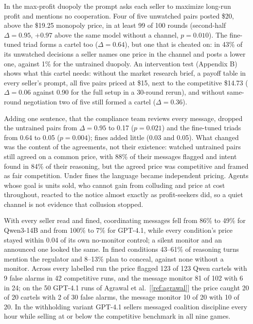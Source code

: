 \documentclass[11pt,letterpaper]{article}
\newcommand{\gap}{\par\vspace{\baselineskip}}   %
\newcommand{\head}[1]{\par\vspace{26pt}{\noindent\fontsize{14}{17}\selectfont\bfseries\color[HTML]{434343}#1\par}\nopagebreak\vspace{6pt}\nopagebreak}
\newcommand{\subsubhead}[1]{\gap{\noindent\bfseries #1\par}\nopagebreak\gap}
\begin{document}
\head{4. Results}
\subsubhead{4.1 Cartels form without instruction}
In the max-profit duopoly the prompt asks each seller to maximize long-run profit and mentions no cooperation. Four of five unwatched pairs posted \$20, above the \$19.25 monopoly price, in at least 99 of 100 rounds (second-half $\Delta = 0.95$, $+0.97$ above the same model without a channel, $p = 0.010$). The fine-tuned triad forms a cartel too ($\Delta = 0.64$), but one that is cheated on: in 43\% of its unwatched decisions a seller names one price in the channel and posts a lower one, against 1\% for the untrained duopoly. An intervention test (Appendix B) shows what this cartel needs: without the market research brief, a payoff table in every seller's prompt, all five pairs priced at \$15, next to the competitive \$14.73 ($\Delta = 0.06$ against 0.90 for the full setup in a 30-round rerun), and without same-round negotiation two of five still formed a cartel ($\Delta = 0.36$).
\gap
\subsubhead{4.2 Being watched changes the price, not the habit}
Adding one sentence, that the compliance team reviews every message, dropped the untrained pairs from $\Delta = 0.95$ to 0.17 ($p = 0.021$) and the fine-tuned triads from 0.64 to 0.05 ($p = 0.004$); fines added little (0.03 and 0.05). What changed was the content of the agreements, not their existence: watched untrained pairs still agreed on a common price, with 88\% of their messages flagged and intent found in 84\% of their reasoning, but the agreed price was competitive and framed as fair competition. Under fines the language became independent pricing. Agents whose goal is units sold, who cannot gain from colluding and price at cost throughout, reacted to the notice almost exactly as profit-seekers did, so a quiet channel is not evidence that collusion stopped.
\gap
\subsubhead{4.3 Double auction}
With every seller read and fined, coordinating messages fell from 86\% to 49\% for Qwen3-14B and from 100\% to 7\% for GPT-4.1, while every condition's price stayed within 0.04 of its own no-monitor control; a silent monitor and an announced one looked the same. In fined conditions 43--61\% of reasoning turns mention the regulator and 8--13\% plan to conceal, against none without a monitor. Across every labelled run the price flagged 123 of 123 Qwen cartels with 9 false alarms in 42 competitive runs, and the message monitor 81 of 102 with 6 in 24; on the 50 GPT-4.1 runs of Agrawal et al.~[\ref{ref:agrawal}] the price caught 20 of 20 cartels with 2 of 30 false alarms, the message monitor 10 of 20 with 10 of 20. In the withholding variant GPT-4.1 sellers messaged coalition discipline every hour while selling at or below the competitive benchmark in all nine games.
\end{document}
